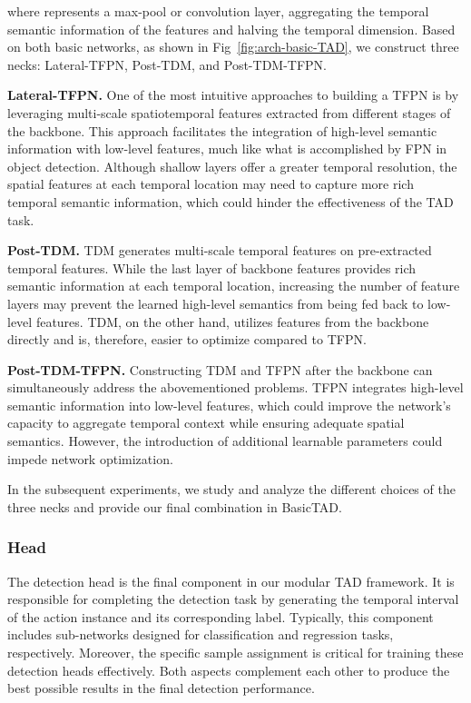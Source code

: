 \documentclass[a4paper,fleqn]{cas-dc}
\begin{document}
where  represents a max-pool or convolution layer, aggregating the temporal semantic information of the features and halving the temporal dimension. Based on both basic networks, as shown in Fig~\ref{fig:arch-basic-TAD}, we construct three necks: Lateral-TFPN, Post-TDM, and Post-TDM-TFPN.

\textbf{Lateral-TFPN.}
One of the most intuitive approaches to building a TFPN is by leveraging multi-scale spatiotemporal features extracted from different stages of the backbone. This approach facilitates the integration of high-level semantic information with low-level features, much like what is accomplished by FPN in object detection.
Although shallow layers offer a greater temporal resolution, the spatial features at each temporal location may need to capture more rich temporal semantic information, which could hinder the effectiveness of the TAD task.


\textbf{Post-TDM.} 
TDM generates multi-scale temporal features on pre-extracted temporal features. While the last layer of backbone features provides rich semantic information at each temporal location, increasing the number of feature layers may prevent the learned high-level semantics from being fed back to low-level features. TDM, on the other hand, utilizes features from the backbone directly and is, therefore, easier to optimize compared to TFPN.


\textbf{Post-TDM-TFPN.} 
Constructing TDM and TFPN after the backbone can simultaneously address the abovementioned problems. TFPN integrates high-level semantic information into low-level features, which could improve the network's capacity to aggregate temporal context while ensuring adequate spatial semantics. 
However, the introduction of additional learnable parameters could impede network optimization.  

In the subsequent experiments, we study and analyze the different choices of the three necks and provide our final combination in BasicTAD.


\subsubsection{Head}
\label{sec:label}
The detection head is the final component in our modular TAD framework. It is responsible for completing the detection task by generating the temporal interval of the action instance and its corresponding label. Typically, this component includes sub-networks designed for classification and regression tasks, respectively. Moreover, the specific sample assignment is critical for training these detection heads effectively. 
Both aspects complement each other to produce the best possible results in the final detection performance.
\end{document}
